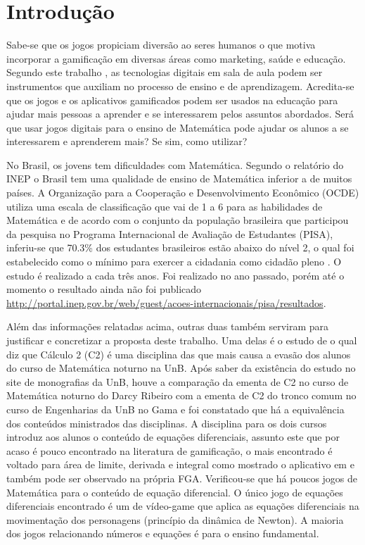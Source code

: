 \chapter[Introdução]{Introdução}


Sabe-se que os jogos propiciam diversão ao seres humanos o que motiva incorporar a gamificação em diversas áreas como marketing, saúde e educação. Segundo este trabalho \cite{revbibmatgam}, as tecnologias digitais em sala de aula podem ser instrumentos que auxiliam no processo de ensino e de aprendizagem. Acredita-se que os jogos e os aplicativos gamificados podem ser usados na educação para ajudar mais pessoas a aprender e se interessarem pelos assuntos abordados. Será que usar jogos digitais para o ensino de Matemática pode ajudar os alunos a se interessarem e aprenderem mais? Se sim, como utilizar? 

No Brasil, os jovens tem dificuldades com Matemática. Segundo o relatório do INEP \cite{inep2015nivelcidadania} o Brasil tem uma qualidade de ensino de Matemática inferior a de muitos países. A Organização para a Cooperação e Desenvolvimento Econômico (OCDE) utiliza uma escala de classificação que vai de 1 a 6 para as habilidades de Matemática e de acordo com o conjunto da população brasileira que participou da pesquisa no Programa Internacional de Avaliação de Estudantes (PISA), inferiu-se que 70.3\% dos estudantes brasileiros estão abaixo do nível 2, o qual foi estabelecido como o mínimo para exercer a cidadania como cidadão pleno \cite{inep2015nivelcidadania}.
O estudo é realizado a cada três anos. Foi realizado no ano passado, porém até o momento o resultado ainda não foi publicado \url{http://portal.inep.gov.br/web/guest/acoes-internacionais/pisa/resultados}.

Além das informações relatadas acima, outras duas também serviram para justificar e concretizar a proposta deste trabalho. Uma delas é o estudo de \cite{evasaoC2} o qual diz que Cálculo 2 (C2) é uma disciplina das que mais causa a evasão dos alunos do curso de Matemática noturno na UnB. Após saber da existência do estudo no site de monografias da UnB, houve a comparação da ementa de C2 no curso de Matemática noturno do Darcy Ribeiro com a ementa de C2 do tronco comum no curso de Engenharias da UnB no Gama e foi constatado que há a equivalência dos conteúdos ministrados das disciplinas. A disciplina para os dois cursos introduz aos alunos o conteúdo de equações diferenciais, assunto este que por acaso é pouco encontrado na literatura de gamificação, o mais encontrado é voltado para área de limite, derivada e integral como mostrado o aplicativo em \cite{appcalculo} e também pode ser observado na própria FGA. Verificou-se que há poucos jogos de Matemática para o conteúdo de equação diferencial. O único jogo de equações diferenciais encontrado é um de vídeo-game que aplica as equações diferenciais na movimentação dos personagens (princípio da dinâmica de Newton)\cite{videoGameED}. A maioria dos jogos relacionando números e equações é para o ensino fundamental.

